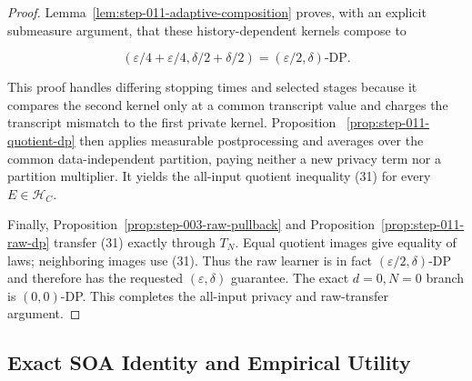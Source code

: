 \begin{proof}
Lemma~\ref{lem:step-011-adaptive-composition} proves, with an explicit
submeasure argument, that these history-dependent kernels compose to

\[
 (\varepsilon/4+\varepsilon/4,
   \delta/2+\delta/2)
 =(\varepsilon/2,\delta)\text{-DP}.
\]

This proof handles differing stopping times and selected stages because it
compares the second kernel only at a common transcript value and charges
the transcript mismatch to the first private kernel. Proposition
~\ref{prop:step-011-quotient-dp} then applies measurable postprocessing and
averages over the common data-independent partition, paying neither a new
privacy term nor a partition multiplier. It yields the all-input quotient
inequality (31) for every \(E\in\mathcal H_C\).

Finally, Proposition~\ref{prop:step-003-raw-pullback} and
Proposition~\ref{prop:step-011-raw-dp} transfer (31) exactly through \(T_N\).
Equal quotient images give equality of laws; neighboring images use (31).
Thus the raw learner is in fact \((\varepsilon/2,\delta)\)-DP and therefore
has the requested \((\varepsilon,\delta)\) guarantee. The exact
\(d=0,N=0\) branch is \((0,0)\)-DP. This completes the all-input privacy
and raw-transfer argument.



\end{proof}

\subsection{Exact SOA Identity and Empirical Utility}\label{app:step_012}


